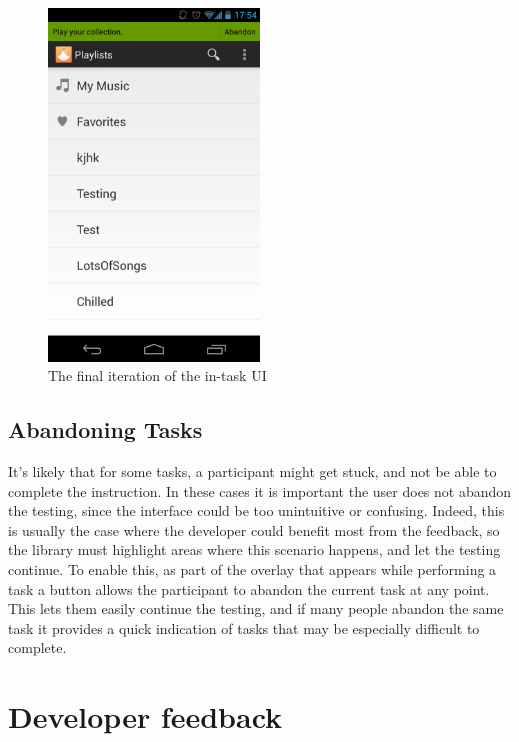 \begin{figure}[ht]
  \centering
  \includegraphics[width=0.5\textwidth]{images/new-in-task}
  \caption{The final iteration of the in-task UI}
  \label{fig:final-task-overlay}
\end{figure}

\subsection{Abandoning Tasks}

It's likely that for some tasks, a participant might get stuck, and not be able
to complete the instruction. In these cases it is important the user does not abandon 
the testing, since the interface could be too unintuitive or confusing. Indeed, this 
is usually the case
where the developer could benefit most from the feedback, so the library must highlight areas
where this scenario happens, and let the testing continue. To
enable this, as part of the overlay that appears while performing a task a
button allows the participant to abandon the current task at any point. This lets them easily continue the testing, and if many people abandon the same task it provides a quick indication of tasks that may be especially difficult to complete.

\section{Developer feedback}
\label{sec:developer-feedback}

